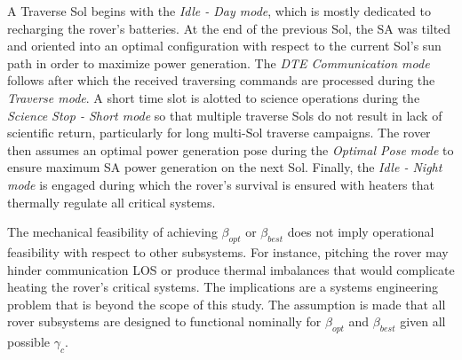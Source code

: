 

A Traverse Sol begins with the \textit{Idle - Day mode}, which is mostly dedicated to recharging the rover's batteries. At the end of the previous Sol, the \ac{SA} was tilted and oriented into an optimal configuration with respect to the current Sol's sun path in order to maximize power generation. The \textit{\ac{DTE} Communication mode}  follows after which the received traversing commands are processed during the \textit{Traverse mode}. A short time slot is alotted to science operations during the \textit{Science Stop - Short mode} so that multiple traverse Sols do not result in lack of scientific return, particularly for long multi-Sol traverse campaigns. The rover then assumes an optimal power generation pose during the \textit{Optimal Pose mode} to ensure maximum \ac{SA} power generation on the next Sol. Finally, the \textit{Idle - Night mode} is engaged during which the rover's survival is ensured with heaters that thermally regulate all critical systems.

The mechanical feasibility of achieving $\beta_{opt}$ or $\beta_{best}$ does not imply operational feasibility with respect to other subsystems. For instance, pitching the rover may hinder communication \ac{LOS} or produce thermal imbalances that would complicate heating the rover's critical systems. The implications are a systems engineering problem that is beyond the scope of this study. The assumption is made that all rover subsystems are designed to functional nominally for $\beta_{opt}$ and $\beta_{best}$ given all possible $\gamma_{c}$.

%


